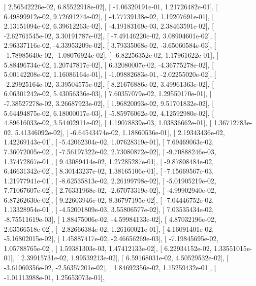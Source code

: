 \documentclass{article}
\begin{document}
       [  2.56542226e-02,   6.85522918e-02],
       [ -1.06320191e-01,   1.21726482e-01],
       [  6.49899912e-02,   9.72691274e-02],
       [ -4.77739138e-02,   1.19207691e-01],
       [  2.13151094e-02,   6.39612263e-02],
       [ -4.19183169e-03,   2.38463591e-02],
       [ -2.62761545e-02,   3.30191787e-02],
       [ -7.49146220e-02,   3.08904601e-02],
       [  2.96337116e-02,  -4.33953209e-02],
       [  3.79335068e-02,  -3.65060584e-03],
       [ -1.78985640e-02,  -1.08076924e-02],
       [ -6.82256352e-02,   1.17961622e-01],
       [  5.88496734e-02,   1.20747817e-02],
       [  6.32080007e-02,  -4.36775278e-02],
       [  5.00142208e-02,   1.16086164e-01],
       [ -1.09882683e-01,  -2.02255020e-02],
       [ -2.29925164e-02,   3.39504575e-02],
       [  8.21676886e-02,   3.49961363e-02],
       [  6.06301242e-02,   5.43056336e-03],
       [  7.60357079e-02,   1.29550170e-01],
       [ -7.38527278e-02,   3.26687923e-02],
       [  1.96820093e-02,   9.51701832e-02],
       [  5.64494875e-02,   6.18000017e-03],
       [ -5.85976062e-02,   4.12592980e-02],
       [  4.89616033e-02,   3.54402911e-02],
       [  1.19078839e-03,   1.03836662e-01],
       [  1.36712783e-02,   5.41346092e-02],
       [ -6.64543474e-02,   1.18860536e-01],
       [  2.19343436e-02,   1.42269143e-01],
       [ -5.42062304e-02,   1.07628319e-01],
       [  7.69469063e-02,   7.36072005e-02],
       [ -7.56197322e-02,   2.73080872e-02],
       [ -9.70888246e-03,   1.37472867e-01],
       [  9.43089414e-02,   1.27285287e-01],
       [ -9.87808484e-02,   6.46631342e-02],
       [  8.30143237e-02,   1.38165106e-01],
       [ -7.15669567e-03,   1.21977941e-01],
       [ -8.62535813e-02,   2.26199798e-02],
       [ -5.01905219e-02,   7.71067607e-02],
       [  2.76331968e-02,  -2.67073319e-02],
       [ -4.99902940e-02,   6.87262630e-02],
       [  9.22603946e-02,   8.36797195e-02],
       [ -7.04446752e-02,   1.13328954e-01],
       [ -4.52001809e-03,   3.55806577e-02],
       [  7.03535434e-02,  -8.75511619e-03],
       [  1.88475006e-02,  -4.59984133e-02],
       [  4.87032196e-02,   2.63566518e-02],
       [ -2.82666384e-02,   1.26160021e-01],
       [  4.16091401e-02,  -5.16802015e-02],
       [  1.45887417e-02,  -2.46656269e-03],
       [ -7.19845695e-02,   1.05788765e-02],
       [  1.59381303e-03,   1.47412133e-02],
       [  6.22934152e-02,   1.33551015e-01],
       [  2.39915731e-02,   1.99539213e-02],
       [  6.59168031e-02,   4.50529532e-02],
       [ -3.61060356e-02,  -2.56357201e-02],
       [  1.84692356e-02,   1.15259432e-01],
       [ -1.01113988e-01,   1.25653073e-01],
\end{document}
